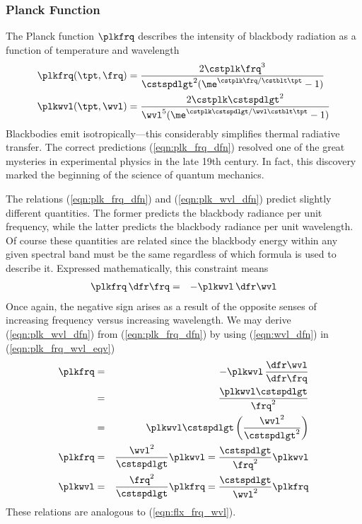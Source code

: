 \documentclass[12pt]{article}
\begin{document}
\subsubsection[Planck Function]{Planck Function}\label{sxn:plk_fnc}
The Planck function $\plkfrq$ describes the intensity of blackbody
radiation as a function of temperature and wavelength
\begin{subequations}
\label{eqn:plk_dfn}
\begin{align}
\label{eqn:plk_frq_dfn}
\plkfrq(\tpt,\frq) & = \frac{2 \cstplk \frq^{3}}{\cstspdlgt^{2} 
( \me^{\cstplk \frq / \cstblt \tpt} - 1)} \\
\label{eqn:plk_wvl_dfn}
\plkwvl(\tpt,\wvl) & = \frac{2 \cstplk \cstspdlgt^{2}}{\wvl^{5} 
( \me^{\cstplk \cstspdlgt / \wvl \cstblt \tpt} - 1)}
\end{align}
\end{subequations}
Blackbodies emit isotropically---this considerably simplifies 
thermal radiative transfer. 
The correct predictions (\ref{eqn:plk_frq_dfn}) resolved one of the
great mysteries in experimental physics in the late 19th century.
In fact, this discovery marked the beginning of the science of quantum 
mechanics. 

The relations (\ref{eqn:plk_frq_dfn}) and (\ref{eqn:plk_wvl_dfn})
predict slightly different quantities. 
The former predicts the blackbody radiance per unit frequency, while
the latter predicts the blackbody radiance per unit wavelength.
Of course these quantities are related since the blackbody energy
within any given spectral band must be the same regardless of which
formula is used to describe it.
Expressed mathematically, this constraint means
\begin{eqnarray}
\plkfrq \,\dfr\frq & = & - \plkwvl \,\dfr\wvl
\label{eqn:plk_frq_wvl_eqv}
\end{eqnarray}
Once again, the negative sign arises as a result of the opposite
senses of increasing frequency versus increasing wavelength.
We may derive (\ref{eqn:plk_wvl_dfn}) from (\ref{eqn:plk_frq_dfn}) 
by using (\ref{eqn:wvl_dfn}) in (\ref{eqn:plk_frq_wvl_eqv}) 
\begin{eqnarray}
\plkfrq & = & - \plkwvl \, \frac{\dfr\wvl}{\dfr\frq} \nonumber \\
& = & \frac{\plkwvl \cstspdlgt}{\frq^{2}} \nonumber \\
& = & \plkwvl \cstspdlgt \left( \frac{\wvl^{2}}{\cstspdlgt^{2}} \right) \nonumber \\
\plkfrq & = & \frac{\wvl^{2}}{\cstspdlgt} \plkwvl = 
\frac{\cstspdlgt}{\frq^{2}} \plkwvl \\
\label{eqn:plk_frq_wvl_dfn}
\plkwvl & = & \frac{\frq^{2}}{\cstspdlgt} \plkfrq =
\frac{\cstspdlgt}{\wvl^{2}} \plkfrq
\label{eqn:plk_wvl_frq_dfn}
\end{eqnarray}
These relations are analogous to (\ref{eqn:flx_frq_wvl}).
\end{document}
